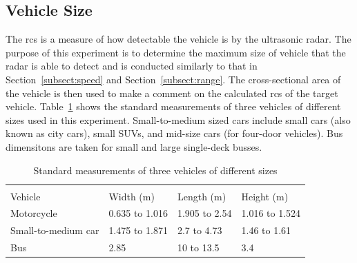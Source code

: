 \documentclass[class=report,11pt,crop=false]{standalone}
\begin{document}
\subsection{Vehicle Size}
The \gls{rcs} is a measure of how detectable the vehicle is by the ultrasonic radar. The purpose of this experiment is to determine the maximum size of vehicle that the radar is able to detect and is conducted similarly to that in Section~\ref{subsect:speed} and Section~\ref{subsect:range}. The cross-sectional area of the vehicle is then used to make a comment on the calculated \gls{rcs} of the target vehicle. Table~\ref{tab:vehicle-sizes} shows the standard measurements of three vehicles of different sizes used in this experiment. Small-to-medium sized cars include small cars (also known as city cars), small SUVs, and mid-size cars (for four-door vehicles). Bus dimensitons are taken for small and large single-deck busses.

\begin{table}[!htp]
\centering
\caption{\label{tab:vehicle-sizes} Standard measurements of three vehicles of different sizes}
\vspace{-0.5cm}
\begin{tabular}{|m{10em}|m{3cm}|m{3cm}|m{3cm}|}
\multicolumn{4}{l}{}\\
\cline{1-4}
Vehicle             &   Width (m)    &   Length (m)   &   Height (m)    \\ \cline{1-4}
Motorcycle          & 0.635 to 1.016 &  1.905 to 2.54 &  1.016 to 1.524 \\ \cline{1-4}
Small-to-medium car & 1.475 to 1.871 &  2.7 to 4.73   &  1.46 to 1.61   \\ \cline{1-4}
Bus                 &     2.85       &   10 to 13.5   &     3.4          \\ \cline{1-4}
\end{tabular}
\end{table}

\ifstandalone

\printnoidxglossary[type=\acronymtype,nonumberlist]
\fi
\end{document}

